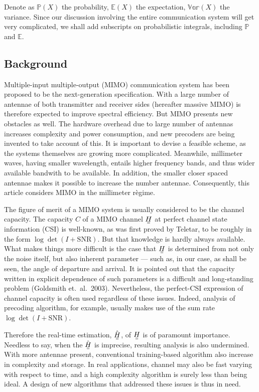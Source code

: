 \documentclass[12pt]{article}
\newcommand{\MB}[1]{\mathbb{#1}}
\newcommand{\RM}[1]{\mathrm{#1}}
\newcommand{\V}[1]{\stackunder[1.2pt]{$#1$}{\rule{.9ex}{.075ex}}}
\newcommand{\M}[1]{\V{\V{#1}}}
\begin{document}
Denote as \(\MB{P}(X)\) the probability, \(\MB{E}(X)\) the expectation, \(\MB{Var}(X)\) the variance.
Since our discussion involving the entire communication system will get very complicated, we shall add subscripts on probabilistic integrals, including \(\MB{P}\) and \(\MB{E}\).


\subsection{Background}

Multiple-input multiple-output (MIMO) communication system has been proposed to be the next-generation specification.
With a large number of antennae of both transmitter and receiver sides (hereafter massive MIMO) is therefore expected to improve spectral efficiency.
But MIMO presents new obstacles as well.
The hardware overhead due to large number of antennas increases complexity and power consumption, and new precoders are being invented to take account of this.
It is important to devise a feasible scheme, as the systems themselves are growing more complicated.
Meanwhile, millimeter waves, having smaller wavelength, entails higher frequency bands, and thus wider available bandwith to be available.
In addition, the smaller closer spaced antennae makes it possible to increase the number antennae.
Consequently, this article considers MIMO in the millimeter r\`egime.

The figure of merit of a MIMO system is usually considered to be the channel capacity.
The capacity \(C\) of a MIMO channel \(\M{H}\) at perfect channel state information (CSI) is well-known, as was first proved by Teletar, to be roughly in the form \(\log \det (I +\RM{SNR})\).
But that knowledge is hardly always available.
What makes things more difficult is the case that \(\M{H}\) is determined from not only the noise itself, but also inherent parameter --- such as, in our case, as shall be seen, the angle of departure and arrival.
It is pointed out that the capacity written in explicit dependence of such parameters is a difficult and long-standing problem (Goldsmith et.\ al.\ 2003).
Nevertheless, the perfect-CSI expression of channel capacity is often used regardless of these issues.
Indeed, analysis of precoding algorithm, for example, usually makes use of the sum rate \(\log \det (I +\RM{SNR})\).

Therefore the real-time estimation, \(\hat{\M{H}}\), of \(\M{H}\) is of paramount importance.
Needless to say, when the \(\hat{\M{H}}\) is imprecise, resulting analysis is also undermined.
With more antennae present, conventional training-based algorithm also increase in complexity and storage.
In real applications, channel may also be fast varying with respect to time, and a high complexity algorithm is surely less than being ideal.
A design of new algorithms that addressed these issues is thus in need.
\end{document}
